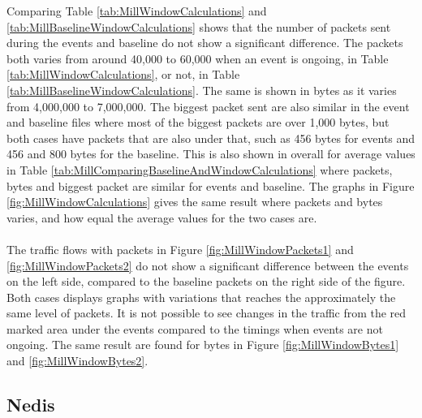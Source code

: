 Comparing Table \ref{tab:MillWindowCalculations} and \ref{tab:MillBaselineWindowCalculations} shows that the number of packets sent during the events and baseline do not show a significant difference. The packets both varies from around 40,000 to 60,000 when an event is ongoing, in Table \ref{tab:MillWindowCalculations}, or not, in Table \ref{tab:MillBaselineWindowCalculations}. The same is shown in bytes as it varies from 4,000,000 to 7,000,000. The biggest packet sent are also similar in the event and baseline files where most of the biggest packets are over 1,000 bytes, but both cases have packets that are also under that, such as 456 bytes for events and 456 and 800 bytes for the baseline. This is also shown in overall for average values in Table \ref{tab:MillComparingBaselineAndWindowCalculations} where packets, bytes and biggest packet are similar for events and baseline. The graphs in Figure \ref{fig:MillWindowCalculations} gives the same result where packets and bytes varies, and how equal the average values for the two cases are. 
\\\\
The traffic flows with packets in Figure \ref{fig:MillWindowPackets1} and \ref{fig:MillWindowPackets2} do not show a significant difference between the events on the left side, compared to the baseline packets on the right side of the figure. Both cases displays graphs with variations that reaches the approximately the same level of packets. It is not possible to see changes in the traffic from the red marked area under the events compared to the timings when events are not ongoing. The same result are found for bytes in Figure \ref{fig:MillWindowBytes1} and \ref{fig:MillWindowBytes2}. 

\newpage
\subsection{Nedis}

